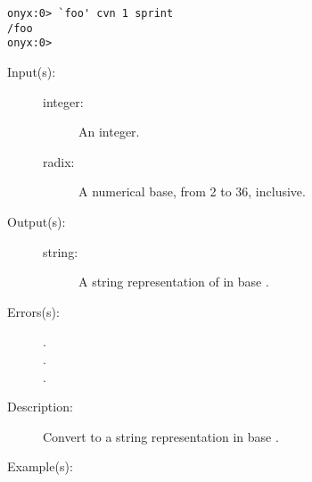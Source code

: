 \begin{description}
\begin{description}
\begin{verbatim}
onyx:0> `foo' cvn 1 sprint
/foo
onyx:0>
		\end{verbatim}
	\end{description}
\label{systemdict:cvrs}
\item[{\onyxop{integer radix}{cvrs}{string}}: ]
	\begin{description}\item[]
	\item[Input(s): ]
		\begin{description}\item[]
		\item[integer: ]
			An integer.
		\item[radix: ]
			A numerical base, from 2 to 36, inclusive.
		\end{description}
	\item[Output(s): ]
		\begin{description}\item[]
		\item[string: ]
			A string representation of  in base
			.
		\end{description}
	\item[Errors(s): ]
		\begin{description}\item[]
		\item[.]
		\item[.]
		\item[.]
		\end{description}
	\item[Description: ]
		Convert  to a string representation in base
		.
	\item[Example(s): ]\begin{verbatim}


\end{verbatim}
\end{description}
\end{description}
